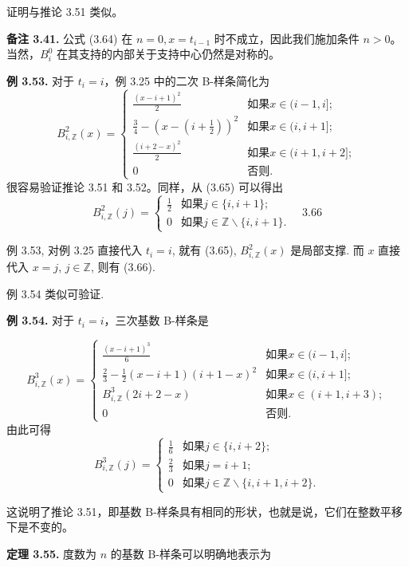 \documentclass[a4paper]{ctexart}
\begin{document}
{证明与推论 3.51 类似。

\noindent \textbf{备注 3.41.} 公式 (3.64) 在 $n=0, x=t_{i-1}$ 时不成立，因此我们施加条件 $n>0$。当然，$B_{i}^0$ 在其支持的内部关于支持中心仍然是对称的。

\noindent \textbf{例 3.53.} 对于 $t_{i}=i$，例 3.25 中的二次 B-样条简化为
\[ 
B_{i, \mathbb{Z}}^2(x)=\begin{cases}\frac{(x-i+1)^2}{2}&\text{如果} x\in(i-1, i];\\ \frac{3}{4}-\left(x-\left(i+\frac{1}{2}\right)\right)^2&\text{如果} x\in(i, i+1];\\ \frac{(i+2-x)^2}{2}&\text{如果} x\in(i+1, i+2];\\ 0&\text{否则.}\end{cases} \tag{3.65}
\]
很容易验证推论 3.51 和 3.52。同样，从 (3.65) 可以得出
\[ 
B_{i, \mathbb{Z}}^2(j)=\begin{cases}\frac{1}{2}&\text{如果} j\in\{i, i+1\};\\ 0&\text{如果} j\in \mathbb{Z}\backslash\{i, i+1\}.\end{cases} \quad{3.66}
\]

例 3.53, 对例 3.25 直接代入 $t_i = i$, 就有 (3.65), $B_{i,
  \mathbb{Z}}^2(x)$ 是局部支撑. 而 $x$ 直接代入 $x = j$, $j \in
\mathbb{Z}$, 则有 (3.66).

例 3.54 类似可验证.

\noindent \textbf{例 3.54.} 对于 $t_{i}=i$，三次基数 B-样条是

\[ 
B_{i, \mathbb{Z}}^3(x)=\begin{cases}\frac{(x-i+1)^3}{6}&\text{如果} x\in(i-1, i];\\ \frac{2}{3}-\frac{1}{2}(x-i+1)(i+1-x)^2&\text{如果} x\in(i, i+1];\\ B_{i, \mathbb{Z}}^3(2i+2-x)&\text{如果} x\in(i+1, i+3);\\ 0&\text{否则.}\end{cases} \tag{3.67}
\]
由此可得
\[ 
B_{i, \mathbb{Z}}^3(j)=\begin{cases}\frac{1}{6}&\text{如果} j\in\{i, i+2\};\\ \frac{2}{3}&\text{如果} j=i+1;\\ 0&\text{如果} j\in \mathbb{Z}\backslash\{i, i+1, i+2\}.\end{cases} 
\tag{3.68}
\]

这说明了推论 3.51，即基数 B-样条具有相同的形状，也就是说，它们在整数平移下是不变的。


\noindent \textbf{定理 3.55.} 度数为 $n$ 的基数 B-样条可以明确地表示为

}
\end{document}
